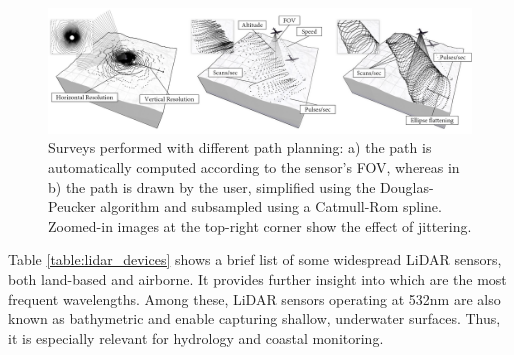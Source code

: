 \begin{figure}[!ht]
	\includegraphics[width=\linewidth]{figs/fundamentals/lidar_patterns.png}
	\caption{Surveys performed with different path planning: a) the path is automatically computed according to the sensor's FOV, whereas in b) the path is drawn by the user, simplified using the Douglas-Peucker algorithm and subsampled using a Catmull-Rom spline. Zoomed-in images at the top-right corner show the effect of jittering. }
    \label{fig:lidar_patterns}
\end{figure}

Table \ref{table:lidar_devices} shows a brief list of some widespread LiDAR sensors, both land-based and airborne. It provides further insight into which are the most frequent wavelengths. Among these, LiDAR sensors operating at 532\si{\nano\meter} are also known as bathymetric and enable capturing shallow, underwater surfaces. Thus, it is especially relevant for hydrology and coastal monitoring.

